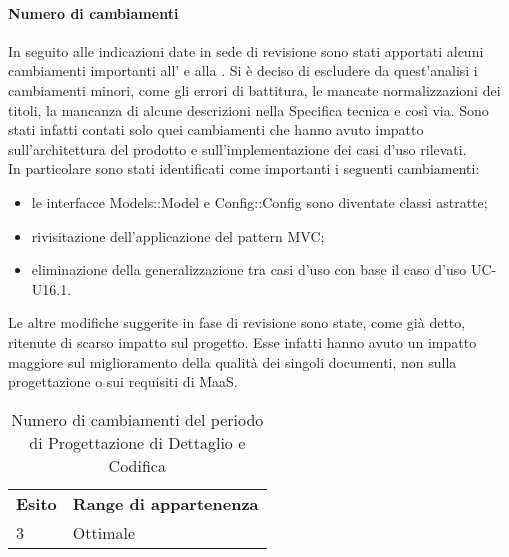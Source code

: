 \paragraph*{Numero di cambiamenti} 
In seguito alle indicazioni date in sede di revisione sono stati apportati alcuni cambiamenti importanti all'\AnalisiDeiRequisiti{} e alla \SpecificaTecnica. Si è deciso di escludere da quest'analisi i cambiamenti minori, come gli errori di battitura, le mancate normalizzazioni dei titoli, la mancanza di alcune descrizioni nella Specifica tecnica e così via. Sono stati infatti contati solo quei cambiamenti che hanno avuto impatto sull'architettura del prodotto e sull'implementazione dei casi d'uso rilevati. \\
In particolare sono stati identificati come importanti i seguenti cambiamenti:
\begin{itemize}
\item le interfacce Models::Model e Config::Config sono diventate classi astratte;
\item rivisitazione dell'applicazione del pattern MVC;
\item eliminazione della generalizzazione tra casi d'uso con base il caso d'uso UC-U16.1.
\end{itemize}
Le altre modifiche suggerite in fase di revisione sono state, come già detto, ritenute di scarso impatto sul progetto. Esse infatti hanno avuto un impatto maggiore sul miglioramento della qualità dei singoli documenti, non sulla progettazione o sui requisiti di MaaS. \\
\begin{table}[H]
\centering
\begin{tabular}{|l|l|}
\cline{1-2}
\textbf{Esito}  & \textbf{Range di appartenenza}  \\ \cline{1-2}
3 & Ottimale \\ \cline{1-2}
\end{tabular}
\caption{Numero di cambiamenti del periodo di Progettazione di Dettaglio e Codifica}
\end{table}

